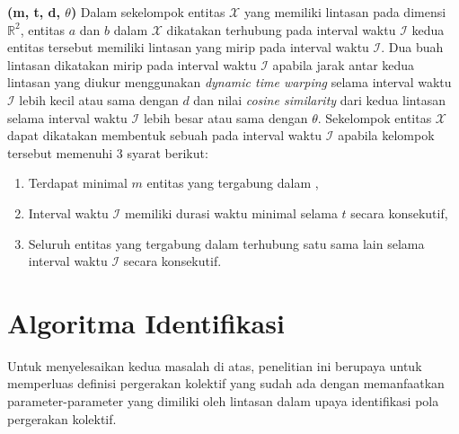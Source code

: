 \textbf{(m, t, d, $\theta$)} Dalam sekelompok entitas $\mathcal{X}$ yang memiliki lintasan pada dimensi $\mathbb{R}^2$, entitas $a$ dan $b$ dalam $\mathcal{X}$ dikatakan terhubung pada interval waktu $\mathcal{I}$ kedua entitas tersebut memiliki lintasan yang mirip pada interval waktu $\mathcal{I}$. Dua buah lintasan dikatakan mirip pada interval waktu $\mathcal{I}$ apabila jarak antar kedua lintasan yang diukur menggunakan \textit{dynamic time warping} selama interval waktu $\mathcal{I}$ lebih kecil atau sama dengan $d$   dan nilai \textit{cosine similarity} dari kedua lintasan selama interval waktu $\mathcal{I}$ lebih besar atau sama dengan $\theta$.
 
Sekelompok entitas $\mathcal{X}$ dapat dikatakan membentuk sebuah  pada interval waktu $\mathcal{I}$ apabila kelompok tersebut memenuhi 3 syarat berikut:

\begin{enumerate}
    \item Terdapat minimal $m$ entitas yang tergabung dalam ,
    \item Interval waktu $\mathcal{I}$ memiliki durasi waktu minimal selama $t$ secara konsekutif, 
    \item Seluruh entitas yang tergabung dalam  terhubung satu sama lain selama interval waktu $\mathcal{I}$ secara konsekutif.
\end{enumerate}


\section{Algoritma Identifikasi \pergerakankolektif}
    
\iffalse

Untuk menyelesaikan kedua masalah di atas, penelitian ini berupaya untuk memperluas  definisi pergerakan kolektif yang sudah ada dengan memanfaatkan parameter-parameter yang dimiliki oleh lintasan dalam upaya identifikasi pola pergerakan kolektif.

